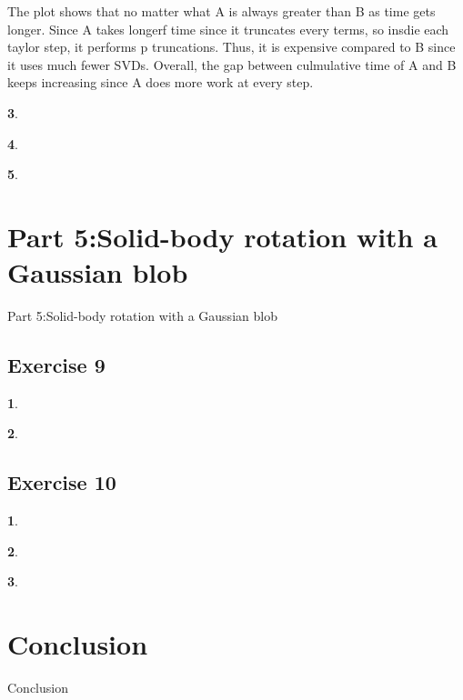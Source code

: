 \documentclass[11pt]{article}
\begin{document}
The plot shows that no matter what A is always greater than B as time gets longer. Since A takes longerf time since it truncates every terms, so insdie each taylor step, it performs p truncations. Thus, it is expensive compared to B since it uses much fewer SVDs. Overall, the gap between culmulative time of A and B keeps increasing since A does more work at every step.

\vspace{1.5em}

\textbf{3}.

\vspace{1.5em}

\textbf{4}.

\vspace{1.5em}

\textbf{5}.

\section*{Part 5:Solid-body rotation with a Gaussian blob}
{Part 5:Solid-body rotation with a Gaussian blob}

\subsection*{Exercise 9}
\textbf{1}.

\vspace{1.5em}

\textbf{2}.

\subsection*{Exercise 10}
\textbf{1}.

\vspace{1.5em}

\textbf{2}.

\vspace{1.5em}

\textbf{3}.


\section*{Conclusion}
{Conclusion}
\end{document}
